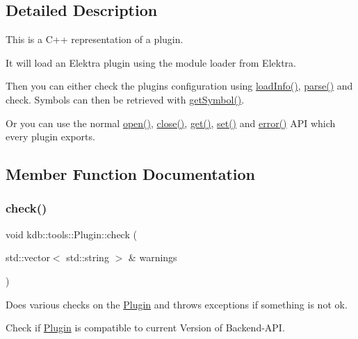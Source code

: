\subsection{Detailed Description}
This is a C++ representation of a plugin. 

It will load an Elektra plugin using the module loader from Elektra.

Then you can either check the plugins configuration using \hyperlink{classkdb_1_1tools_1_1Plugin_a3a0c6a956d1714002ef9baf8c9d99167}{load\+Info()}, \hyperlink{classkdb_1_1tools_1_1Plugin_adfcba2fbdeb436a1083410df804d5fb0}{parse()} and check. Symbols can then be retrieved with \hyperlink{classkdb_1_1tools_1_1Plugin_aca31140802ab463d5bddd95dee73194d}{get\+Symbol()}.

Or you can use the normal \hyperlink{classkdb_1_1tools_1_1Plugin_a680a490123b5290441d76ef2c1e3f1fa}{open()}, \hyperlink{classkdb_1_1tools_1_1Plugin_a40b5fd413f3f6da735680ed8d7c8a6a2}{close()}, \hyperlink{classkdb_1_1tools_1_1Plugin_a2aa6ff55f9cf81a59d2a8d271fe68e0f}{get()}, \hyperlink{classkdb_1_1tools_1_1Plugin_abf84d512b48f6fa1b89636217537cde0}{set()} and \hyperlink{classkdb_1_1tools_1_1Plugin_a8ec348b49a34ef17fda64cb289b8cf64}{error()} A\+PI which every plugin exports. 

\subsection{Member Function Documentation}
\mbox{\label{classkdb_1_1tools_1_1Plugin_a5bb3db65b9d87d18787da8cc65eaca65}} 
\subsubsection{\texorpdfstring{check()}{check()}}
{\footnotesize\ttfamily void kdb\+::tools\+::\+Plugin\+::check (\begin{DoxyParamCaption}\item[{std\+::vector$<$ std\+::string $>$ \&}]{warnings }\end{DoxyParamCaption})}



Does various checks on the \hyperlink{classkdb_1_1tools_1_1Plugin}{Plugin} and throws exceptions if something is not ok. 


\begin{DoxyItemize}
\item Check if \hyperlink{classkdb_1_1tools_1_1Plugin}{Plugin} is compatible to current Version of Backend-\/\+A\+PI.
\end{DoxyItemize}



